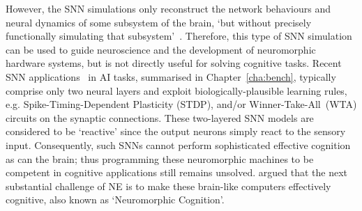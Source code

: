 However, the SNN simulations only reconstruct the network behaviours and neural dynamics of some subsystem of the brain, `but without precisely functionally simulating that subsystem'~\citep{de2010world}.
Therefore, this type of SNN simulation can be used to guide neuroscience and the development of neuromorphic hardware systems, but is not directly useful for solving cognitive tasks.
Recent SNN applications~\citep{bill2014compound,diehl2015unsupervised} in AI tasks, summarised in Chapter~\ref{cha:bench}, typically comprise only two neural layers and exploit biologically-plausible learning rules, e.g. Spike-Timing-Dependent Plasticity (STDP), and/or Winner-Take-All~(WTA) circuits on the synaptic connections.
These two-layered SNN models are considered to be `reactive' since the output neurons simply react to the sensory input.
Consequently, such SNNs cannot perform sophisticated effective cognition as can the brain;
thus programming these neuromorphic machines to be competent in cognitive applications still remains unsolved.
\citet{indiveri2009artificial} argued that the next substantial challenge of NE is to make these brain-like computers effectively cognitive, also known as `Neuromorphic Cognition'.


%
%

